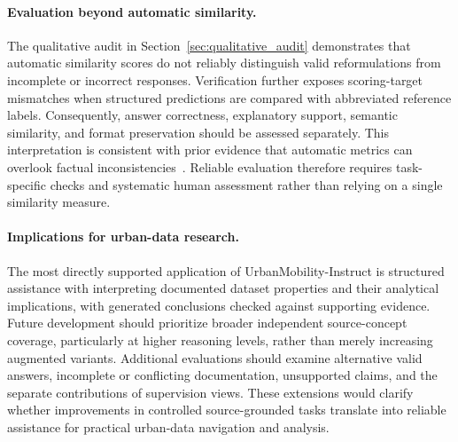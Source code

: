 \documentclass[a4paper,fleqn]{cas-sc}
\begin{document}
\paragraph{Evaluation beyond automatic similarity.}
The qualitative audit in Section~\ref{sec:qualitative_audit} demonstrates that automatic similarity scores do not reliably distinguish valid reformulations from incomplete or incorrect responses. Verification further exposes scoring-target mismatches when structured predictions are compared with abbreviated reference labels. Consequently, answer correctness, explanatory support, semantic similarity, and format preservation should be assessed separately. This interpretation is consistent with prior evidence that automatic metrics can overlook factual inconsistencies~\cite{wang2020asking}. Reliable evaluation therefore requires task-specific checks and systematic human assessment rather than relying on a single similarity measure.

\paragraph{Implications for urban-data research.}
The most directly supported application of UrbanMobility-Instruct is structured assistance with interpreting documented dataset properties and their analytical implications, with generated conclusions checked against supporting evidence. Future development should prioritize broader independent source-concept coverage, particularly at higher reasoning levels, rather than merely increasing augmented variants. Additional evaluations should examine alternative valid answers, incomplete or conflicting documentation, unsupported claims, and the separate contributions of supervision views. These extensions would clarify whether improvements in controlled source-grounded tasks translate into reliable assistance for practical urban-data navigation and analysis.


\end{document}
